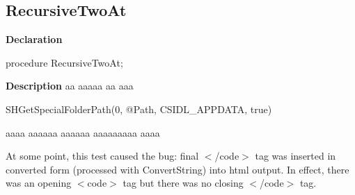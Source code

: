 \documentclass{report}
\begin{document}
\subsection*{RecursiveTwoAt}
\begin{list}{}{
\setlength{\itemindent}{0cm}
\setlength{\listparindent}{0cm}
\setlength{\leftmargin}{\evensidemargin}
\addtolength{\leftmargin}{\tmplength}
\settowidth{\labelsep}{X}
\addtolength{\leftmargin}{\labelsep}
\setlength{\labelwidth}{\tmplength}
}
\begin{flushleft}
\item[\textbf{Declaration}\hfill]
\begin{ttfamily}
procedure RecursiveTwoAt;\end{ttfamily}


\end{flushleft}
\par
\item[\textbf{Description}]
aa aaaaa aa aaa \begin{ttfamily}SHGetSpecialFolderPath(0, @Path, CSIDL{\_}APPDATA, true)\end{ttfamily} aaaa aaaaaa aaaaaa aaaaaaaaa aaaa

At some point, this test caused the bug: final {$<$}/code{$>$} tag was inserted in converted form (processed with ConvertString) into html output. In effect, there was an opening {$<$}code{$>$} tag but there was no closing {$<$}/code{$>$} tag.

\end{list}
\end{document}

